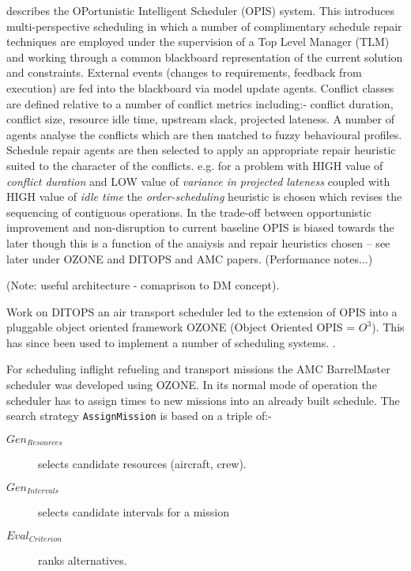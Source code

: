 \cite{smith95reactive} describes the OPortunistic Intelligent Scheduler (OPIS) system. This introduces multi-perspective scheduling in which a number of complimentary schedule repair techniques are employed under the supervision of a Top Level Manager (TLM) and working through a common blackboard representation of the current solution and constraints. External events (changes to requirements, feedback from execution) are fed into the blackboard via model update agents. Conflict classes are defined relative to a number of conflict metrics including:- conflict duration, conflict size, resource idle time, upstream slack, projected lateness. A number of agents analyse the conflicts which are then matched to fuzzy behavioural profiles. Schedule repair agents are then selected to apply an appropriate repair heuristic suited to the character of the conflicts. e.g. for a problem with HIGH value of \emph{conflict duration} and LOW value of \emph{variance in projected lateness} coupled with HIGH value of \emph{idle time} the \emph{order-scheduling} heuristic is chosen which revises the sequencing of contiguous operations. In the trade-off between opportunistic improvement and non-disruption to current baseline OPIS is biased towards the later though this is a function of the anaiysis and repair heuristics chosen -- see later under OZONE and DITOPS and AMC papers. (Performance notes...) 

(Note: useful architecture - comaprison to DM concept).

Work on DITOPS \cite{smith96mixed} an air transport scheduler led to the extension of OPIS into a pluggable object oriented framework OZONE (Object Oriented OPIS = $O^3$). This has since been used to implement a number of scheduling systems. .

For scheduling inflight refueling and transport missions the AMC BarrelMaster scheduler \cite{smith04continuous} was developed using OZONE. In its normal mode of operation the scheduler has to assign times to new missions into an already built schedule. The search strategy \texttt{AssignMission} is based on a triple of:-
\begin{description}
\item[$Gen_{Resources}$] selects candidate resources (aircraft, crew).
\item[$Gen_{Intervals}$] selects candidate intervals for a mission
\item[$Eval_{Criterion}$] ranks alternatives.
\end{description}

